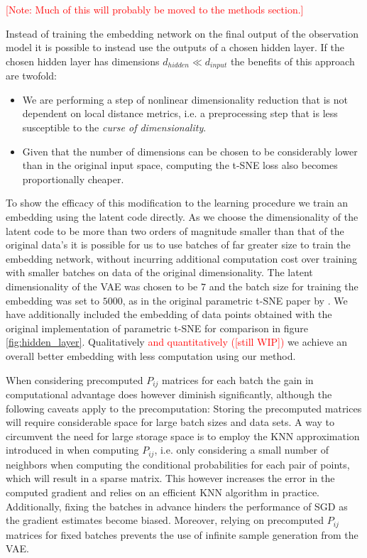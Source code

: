 \textcolor{red}{[Note: Much of this will probably be moved to the methods section.]}

Instead of training the embedding network on the final output of the observation model it is possible to instead use the outputs of a chosen hidden layer. If the chosen hidden layer has dimensions $d_{hidden} \ll d_{input}$ the benefits of this approach are twofold:

\begin{itemize}
\item We are performing a step of nonlinear dimensionality reduction that is not dependent on local distance metrics, i.e. a preprocessing step that is less susceptible to the \textit{curse of dimensionality}.
\item Given that the number of dimensions can be chosen to be considerably lower than in the original input space, computing the t-SNE loss also becomes proportionally cheaper.
\end{itemize}

To show the efficacy of this modification to the learning procedure we train an embedding using the latent code directly. As we choose the dimensionality of the latent code to be more than two orders of magnitude smaller than that of the original data's it is possible for us to use batches of far greater size to train the embedding network, without incurring additional computation cost over training with smaller batches on data of the original dimensionality. The latent dimensionality of the VAE was chosen to be $7$ and the batch size for training the embedding was set to $5000$, as in the original parametric t-SNE paper by \cite{parametric_tsne}. We have additionally included the embedding of data points obtained with the original implementation of parametric t-SNE for comparison in figure \ref{fig:hidden_layer}. Qualitatively \textcolor{red}{and quantitatively ([still WIP])} we achieve an overall better embedding with less computation using our method.

When considering precomputed $P_{ij}$ matrices for each batch the gain in computational advantage does however diminish significantly, although the following caveats apply to the precomputation: Storing the precomputed matrices will require considerable space for large batch sizes and data sets. A way to circumvent the need for large storage space is to employ the KNN approximation introduced in \citep{accelerated_tsne_2} when computing $P_{ij}$, i.e. only considering a small number of neighbors when computing the conditional probabilities for each pair of points, which will result in a sparse matrix. This however increases the error in the computed gradient and relies on an efficient KNN algorithm in practice. Additionally, fixing the batches in advance hinders the performance of SGD as the gradient estimates become biased. Moreover, relying on precomputed $P_{ij}$ matrices for fixed batches prevents the use of infinite sample generation from the VAE.

